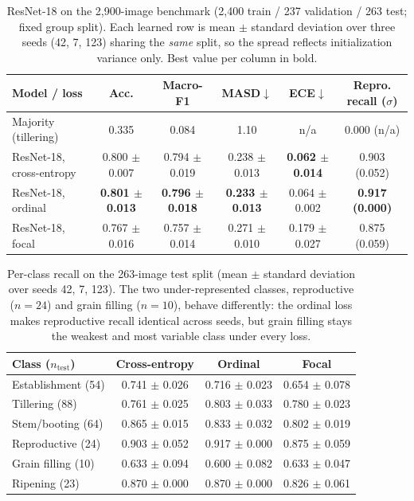 \documentclass[conference]{IEEEtran}
\begin{document}
\begin{table}[t]
\centering
\caption{ResNet-18 on the 2{,}900-image benchmark (2{,}400 train / 237 validation / 263 test; fixed group split). Each learned row is mean $\pm$ standard deviation over three seeds (42, 7, 123) sharing the \emph{same} split, so the spread reflects initialization variance only. Best value per column in bold.}
\label{tab:results}
\small
\begin{tabular}{lccccc}
\toprule
\textbf{Model / loss} & \textbf{Acc.} & \textbf{Macro-F1} & \textbf{MASD}$\downarrow$ & \textbf{ECE}$\downarrow$ & \textbf{Repro. recall ($\sigma$)} \\
\midrule
Majority (tillering) & 0.335 & 0.084 & 1.10 & n/a & 0.000 (n/a) \\
ResNet-18, cross-entropy & 0.800 $\pm$ 0.007 & 0.794 $\pm$ 0.019 & 0.238 $\pm$ 0.013 & \textbf{0.062 $\pm$ 0.014} & 0.903 (0.052) \\
ResNet-18, ordinal & \textbf{0.801 $\pm$ 0.013} & \textbf{0.796 $\pm$ 0.018} & \textbf{0.233 $\pm$ 0.013} & 0.064 $\pm$ 0.002 & \textbf{0.917 (0.000)} \\
ResNet-18, focal & 0.767 $\pm$ 0.016 & 0.757 $\pm$ 0.014 & 0.271 $\pm$ 0.010 & 0.179 $\pm$ 0.027 & 0.875 (0.059) \\
\bottomrule
\end{tabular}
\end{table}

\begin{table}[t]
\centering
\caption{Per-class recall on the 263-image test split (mean $\pm$ standard deviation over seeds 42, 7, 123). The two under-represented classes, reproductive ($n{=}24$) and grain filling ($n{=}10$), behave differently: the ordinal loss makes reproductive recall identical across seeds, but grain filling stays the weakest and most variable class under every loss.}
\label{tab:perclass}
\small
\begin{tabular}{lccc}
\toprule
\textbf{Class ($n_{\text{test}}$)} & \textbf{Cross-entropy} & \textbf{Ordinal} & \textbf{Focal} \\
\midrule
Establishment (54) & 0.741 $\pm$ 0.026 & 0.716 $\pm$ 0.023 & 0.654 $\pm$ 0.078 \\
Tillering (88) & 0.761 $\pm$ 0.025 & 0.803 $\pm$ 0.033 & 0.780 $\pm$ 0.023 \\
Stem/booting (64) & 0.865 $\pm$ 0.015 & 0.833 $\pm$ 0.032 & 0.802 $\pm$ 0.019 \\
Reproductive (24) & 0.903 $\pm$ 0.052 & 0.917 $\pm$ 0.000 & 0.875 $\pm$ 0.059 \\
Grain filling (10) & 0.633 $\pm$ 0.094 & 0.600 $\pm$ 0.082 & 0.633 $\pm$ 0.047 \\
Ripening (23) & 0.870 $\pm$ 0.000 & 0.870 $\pm$ 0.000 & 0.826 $\pm$ 0.061 \\
\bottomrule
\end{tabular}
\end{table}
\end{document}
